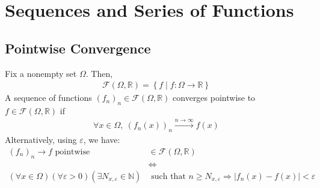 \documentclass[10pt]{extarticle}
\newcommand{\N}{\mathbb{N}}
\newcommand{\R}{\mathbb{R}}
\begin{document}
  \section{Sequences and Series of Functions}%
  \subsection{Pointwise Convergence}%
    Fix a nonempty set $\Omega$. Then,
    \begin{align*}
      \mathcal{F}(\Omega,\R) = \left\{f\mid f: \Omega \rightarrow \R\right\}
    \end{align*}
    A sequence of functions $(f_n)_n\in \mathcal{F}(\Omega,\R)$ converges pointwise to $f\in \mathcal{F}(\Omega,\R)$ if
    \begin{align*}
      \forall x\in\Omega,~(f_n(x))_n \xrightarrow{n\rightarrow\infty}f(x)
    \end{align*}
    Alternatively, using $\varepsilon$, we have:
    \begin{align*}
      (f_n)_n \rightarrow f \text{ pointwise } &\in \mathcal{F}(\Omega,\R)\\
                                               &\Leftrightarrow\\
      (\forall x\in\Omega)(\forall \varepsilon > 0) (\exists N_{x,\varepsilon}\in\N) &\text{ such that } n\geq N_{x,\varepsilon} \Rightarrow \left|f_n(x) - f(x)\right| < \varepsilon
    \end{align*}
\end{document}
